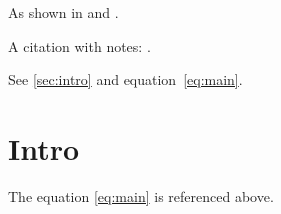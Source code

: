 As shown in \cite{knuth1984} and \cite{lamport1994, mittelbach2004}.

A citation with notes: \citep[see][p.~5]{knuth1984}.

See \autoref{sec:intro} and equation~\eqref{eq:main}.

\section{Intro}\label{sec:intro}
The equation \ref{eq:main} is referenced above.

